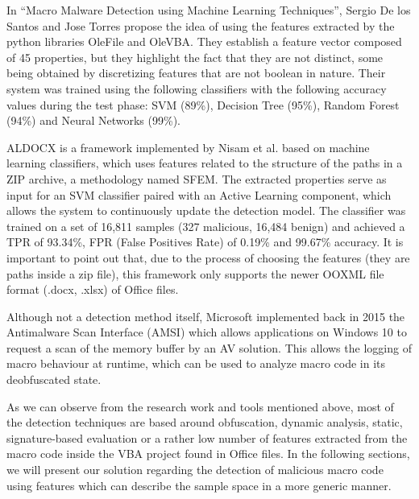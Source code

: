 In “Macro Malware Detection using Machine Learning Techniques”, Sergio De los Santos and Jose Torres propose the idea of using the features extracted by the python libraries OleFile and OleVBA. They establish a feature vector composed of 45 properties, but they highlight the fact that they are not distinct, some being obtained by discretizing features that are not boolean in nature. Their system was trained  using the following classifiers with the following accuracy values during the test phase: SVM (89\%),  Decision Tree (95\%), Random Forest (94\%) and Neural Networks (99\%). 
\par
ALDOCX is a framework implemented by Nisam et al. based on machine learning classifiers, which uses features related to the structure of the paths in a ZIP archive, a methodology named SFEM. The extracted properties serve as input for an SVM classifier paired with an Active Learning component, which allows the system to continuously update the detection model. The classifier was trained on a set of 16,811 samples (327 malicious, 16,484 benign) and achieved a TPR of 93.34\%, FPR (False Positives Rate) of 0.19\% and 99.67\% accuracy. It is important to point out that, due to the process of choosing the features (they are paths inside a zip file), this framework only supports the newer OOXML file format (.docx, .xlsx) of Office files.
\par
Although not a detection method itself, Microsoft implemented back in 2015 the Antimalware Scan Interface (AMSI) which allows applications on Windows 10 to request a scan of the memory buffer by an AV solution. This allows the logging of macro behaviour at runtime, which can be used to analyze macro code in its deobfuscated state.
\par
As we can observe from the research work and tools mentioned above, most of the detection techniques are based around obfuscation, dynamic analysis, static, signature-based evaluation or a rather low number of features extracted from the macro code inside the VBA project found in Office files.
In the following sections, we will present our solution regarding the detection of malicious macro code using features which can describe the sample space in a more generic manner.
